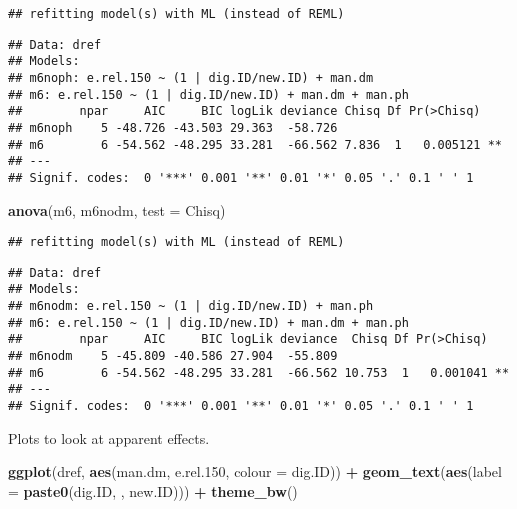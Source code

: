 \documentclass[
]{article}
\newenvironment{Shaded}{\begin{snugshade}}{\end{snugshade}}
\newcommand{\AttributeTok}[1]{\textcolor[rgb]{0.13,0.29,0.53}{#1}}
\newcommand{\FloatTok}[1]{\textcolor[rgb]{0.00,0.00,0.81}{#1}}
\newcommand{\FunctionTok}[1]{\textcolor[rgb]{0.13,0.29,0.53}{\textbf{#1}}}
\newcommand{\NormalTok}[1]{#1}
\newcommand{\SpecialCharTok}[1]{\textcolor[rgb]{0.81,0.36,0.00}{\textbf{#1}}}
\newcommand{\StringTok}[1]{\textcolor[rgb]{0.31,0.60,0.02}{#1}}
\begin{document}
\begin{verbatim}
## refitting model(s) with ML (instead of REML)
\end{verbatim}

\begin{verbatim}
## Data: dref
## Models:
## m6noph: e.rel.150 ~ (1 | dig.ID/new.ID) + man.dm
## m6: e.rel.150 ~ (1 | dig.ID/new.ID) + man.dm + man.ph
##        npar     AIC     BIC logLik deviance Chisq Df Pr(>Chisq)   
## m6noph    5 -48.726 -43.503 29.363  -58.726                       
## m6        6 -54.562 -48.295 33.281  -66.562 7.836  1   0.005121 **
## ---
## Signif. codes:  0 '***' 0.001 '**' 0.01 '*' 0.05 '.' 0.1 ' ' 1
\end{verbatim}

\begin{Shaded}
\begin{Highlighting}[]
\FunctionTok{anova}\NormalTok{(m6, m6nodm, }\AttributeTok{test =} \StringTok{\textquotesingle{}Chisq\textquotesingle{}}\NormalTok{)}
\end{Highlighting}
\end{Shaded}

\begin{verbatim}
## refitting model(s) with ML (instead of REML)
\end{verbatim}

\begin{verbatim}
## Data: dref
## Models:
## m6nodm: e.rel.150 ~ (1 | dig.ID/new.ID) + man.ph
## m6: e.rel.150 ~ (1 | dig.ID/new.ID) + man.dm + man.ph
##        npar     AIC     BIC logLik deviance  Chisq Df Pr(>Chisq)   
## m6nodm    5 -45.809 -40.586 27.904  -55.809                        
## m6        6 -54.562 -48.295 33.281  -66.562 10.753  1   0.001041 **
## ---
## Signif. codes:  0 '***' 0.001 '**' 0.01 '*' 0.05 '.' 0.1 ' ' 1
\end{verbatim}

Plots to look at apparent effects.

\begin{Shaded}
\begin{Highlighting}[]
\FunctionTok{ggplot}\NormalTok{(dref, }\FunctionTok{aes}\NormalTok{(man.dm, e.rel}\FloatTok{.150}\NormalTok{, }\AttributeTok{colour =}\NormalTok{ dig.ID)) }\SpecialCharTok{+}
  \FunctionTok{geom\_text}\NormalTok{(}\FunctionTok{aes}\NormalTok{(}\AttributeTok{label =} \FunctionTok{paste0}\NormalTok{(dig.ID, }\StringTok{\textquotesingle{}{-}\textquotesingle{}}\NormalTok{, new.ID))) }\SpecialCharTok{+}
  \FunctionTok{theme\_bw}\NormalTok{()}
\end{Highlighting}
\end{Shaded}
\end{document}
